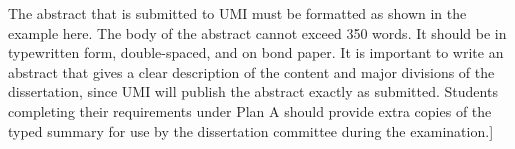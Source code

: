 \documentclass[12pt,draftcls]{ucdavisthesis}
\begin{document}
The abstract that is submitted to UMI must be formatted as shown in the example here. The body of the abstract cannot exceed 350 words. It should be in typewritten form, double-spaced, and on bond paper. It is important to write an abstract that gives a clear description of the content and major divisions of the dissertation, since UMI will publish the abstract exactly as submitted. Students completing their requirements under Plan A should provide extra copies of the typed summary for use by the dissertation committee during the examination.]
\end{document}
